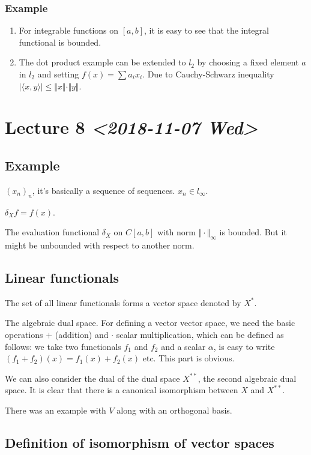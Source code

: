 \documentclass[11pt]{article}
\begin{document}
\subsubsection{Example}
\label{sec:org7edf41b}
\begin{enumerate}
\item For integrable functions on \([a, b]\), it is easy to see that the integral
functional is bounded.
\item The dot product example can be extended to \(l_2\) by choosing a fixed
element \(a\) in \(l_2\) and setting \(f(x) = \sum a_i x_i\). Due to
Cauchy-Schwarz inequality \(\vert \langle x, y\rangle\vert \le \Vert x
       \Vert \cdot \Vert y \Vert\).
\end{enumerate}
\section{Lecture 8 \textit{<2018-11-07 Wed>}}
\label{sec:orgf0944a7}
\subsection{Example}
\label{sec:orgb63e20f}
\((x_n)_n\), it's basically a sequence of sequences. \(x_n \in l_\infty\).

\(\delta_X f = f(x)\).

The evaluation functional \(\delta_X\) on \(C[a, b]\) with norm \(\Vert \cdot
   \Vert_\infty\) is bounded. But it might be unbounded with respect to another
norm.
\subsection{Linear functionals}
\label{sec:orgf30cade}
The set of all linear functionals forms a vector space denoted by \(X^{*}\).

The algebraic dual space. For defining a vector vector space, we need the
basic operations \(+\) (addition) and \(\cdot\) scalar multiplication, which can be
defined as follows: we take two functionals \(f_1\) and \(f_2\) and a scalar
\(\alpha\), is easy to write \((f_1 + f_2)(x) = f_1(x) + f_2(x)\) etc. This part
is obvious.

We can also consider the dual of the dual space \(X^{**}\), the second
algebraic dual space. It is clear that there is a canonical isomorphism
between \(X\) and \(X^{**}\).

There was an example with \(V\) along with an orthogonal basis.
\subsection{Definition of isomorphism of vector spaces}
\label{sec:org35ede2c}
\end{document}
